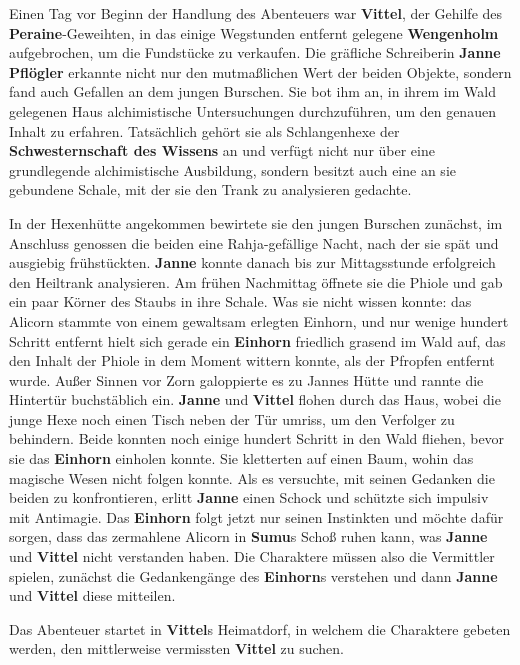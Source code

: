Einen Tag vor Beginn der Handlung des Abenteuers war \textbf{Vittel}, der Gehilfe des \textbf{Peraine}-Geweihten, in das einige Wegstunden entfernt gelegene \textbf{Wengenholm} aufgebrochen, um die Fundstücke zu verkaufen.
Die gräfliche Schreiberin \textbf{Janne Pflögler} erkannte nicht nur den mutmaßlichen Wert der beiden Objekte, sondern fand auch Gefallen an dem jungen Burschen.
Sie bot ihm an, in ihrem im Wald gelegenen Haus alchimistische Untersuchungen durchzuführen, um den genauen Inhalt zu erfahren.
Tatsächlich gehört sie als Schlangenhexe der \textbf{Schwesternschaft des Wissens} an und verfügt nicht nur über eine grundlegende alchimistische Ausbildung, sondern besitzt auch eine an sie gebundene Schale, mit der sie den Trank zu analysieren gedachte.

In der Hexenhütte angekommen bewirtete sie den jungen Burschen zunächst, im Anschluss genossen die beiden eine Rahja-gefällige Nacht, nach der sie spät und 
ausgiebig frühstückten.
\textbf{Janne} konnte danach bis zur Mittagsstunde erfolgreich den Heiltrank analysieren.
Am frühen Nachmittag öffnete sie die Phiole und gab ein paar Körner des Staubs in ihre Schale. Was sie nicht wissen konnte:
das Alicorn stammte von einem gewaltsam erlegten Einhorn, und nur wenige hundert Schritt entfernt hielt sich gerade ein \textbf{Einhorn} friedlich grasend im Wald auf, das den Inhalt der Phiole in dem Moment wittern konnte, als der Pfropfen entfernt wurde.
Außer Sinnen vor Zorn galoppierte es zu Jannes Hütte und rannte die Hintertür buchstäblich ein.
\textbf{Janne} und \textbf{Vittel} flohen durch das Haus, wobei die junge Hexe noch einen Tisch neben der Tür umriss, um den Verfolger zu behindern.
Beide konnten noch einige hundert Schritt in den Wald fliehen, bevor sie das \textbf{Einhorn} einholen konnte.
Sie kletterten auf einen Baum, wohin das magische Wesen nicht folgen konnte.
Als es versuchte, mit seinen Gedanken die beiden zu konfrontieren, erlitt \textbf{Janne} einen Schock und schützte sich impulsiv mit Antimagie.
Das \textbf{Einhorn} folgt jetzt nur seinen Instinkten und möchte dafür sorgen, dass das zermahlene Alicorn in \textbf{Sumu}s Schoß ruhen kann, was \textbf{Janne} und \textbf{Vittel} nicht verstanden haben.
Die Charaktere müssen also die Vermittler spielen, zunächst die Gedankengänge des \textbf{Einhorn}s verstehen und dann \textbf{Janne} und \textbf{Vittel} diese mitteilen.

Das Abenteuer startet in \textbf{Vittel}s Heimatdorf, in welchem die Charaktere gebeten werden, den mittlerweise vermissten \textbf{Vittel} zu suchen. 

